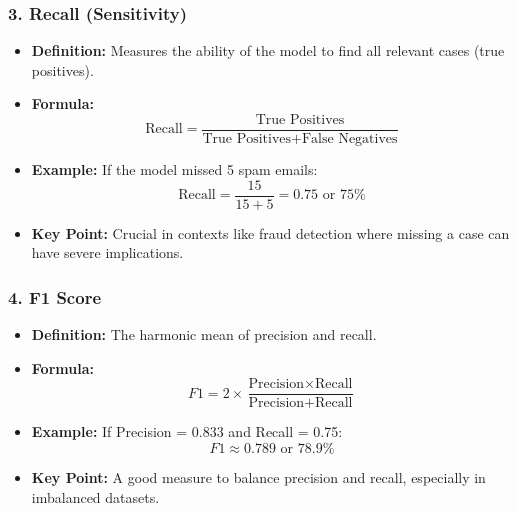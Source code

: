 \documentclass[aspectratio=169]{beamer}
\begin{document}
\begin{frame}[fragile]
    \frametitle{3. Recall (Sensitivity)}
    \begin{itemize}
        \item \textbf{Definition:} Measures the ability of the model to find all relevant cases (true positives).
        \item \textbf{Formula:}
        \begin{equation}
        \text{Recall} = \frac{\text{True Positives}}{\text{True Positives} + \text{False Negatives}}
        \end{equation}
        \item \textbf{Example:} If the model missed 5 spam emails:
        \begin{equation}
        \text{Recall} = \frac{15}{15 + 5} = 0.75 \text{ or } 75\%
        \end{equation}
        \item \textbf{Key Point:} Crucial in contexts like fraud detection where missing a case can have severe implications.
    \end{itemize}
\end{frame}

\begin{frame}[fragile]
    \frametitle{4. F1 Score}
    \begin{itemize}
        \item \textbf{Definition:} The harmonic mean of precision and recall.
        \item \textbf{Formula:}
        \begin{equation}
        F1 = 2 \times \frac{\text{Precision} \times \text{Recall}}{\text{Precision} + \text{Recall}}
        \end{equation}
        \item \textbf{Example:} If Precision = 0.833 and Recall = 0.75:
        \begin{equation}
        F1 \approx 0.789 \text{ or } 78.9\%
        \end{equation}
        \item \textbf{Key Point:} A good measure to balance precision and recall, especially in imbalanced datasets.
    \end{itemize}
\end{frame}
\end{document}
